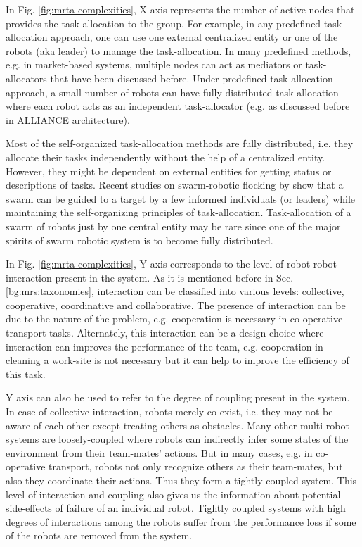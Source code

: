 In Fig. \ref{fig:mrta-complexities}, X axis represents the number of active nodes that provides the task-allocation to the group. For example, in any predefined  task-allocation approach, one can use one external centralized entity or one of the robots (aka leader) to manage the task-allocation. In many predefined methods, e.g. in market-based systems,  multiple nodes can act as mediators or task-allocators that have been discussed before. Under predefined task-allocation approach,  a small number of robots can have fully distributed task-allocation where each robot acts as an independent task-allocator (e.g. as discussed before in ALLIANCE architecture). 

Most of the self-organized task-allocation methods are fully distributed, i.e. they allocate their tasks independently without the help of a centralized entity. However, they might be dependent on external entities for getting status or descriptions of tasks. Recent studies on swarm-robotic flocking by  show that a swarm can be guided to a target by a few informed individuals (or leaders) while  maintaining the self-organizing principles of task-allocation. Task-allocation of a swarm of robots  just by one central entity may be rare since one of the major spirits of swarm robotic system is to become fully distributed.

In Fig. \ref{fig:mrta-complexities},  Y axis corresponds to the level of robot-robot interaction present in the system. As it is mentioned before in Sec. \ref{bg:mrs:taxonomies}, interaction can be classified into various levels: collective, cooperative, coordinative and collaborative. The presence of interaction can be due to the nature of the problem, e.g. cooperation is necessary in co-operative transport tasks. Alternately, this interaction can be a design choice where interaction can improves the performance of the team, e.g. cooperation in cleaning a work-site is not necessary but it can help to improve the  efficiency of this task. 

Y axis can also be used to refer to the degree of coupling present in the system.  In case of collective interaction, robots merely co-exist, i.e.  they may not be aware of each other except treating others as obstacles. Many other multi-robot systems are loosely-coupled where robots can indirectly infer some states of the environment from their team-mates' actions.  But in many cases, e.g. in  co-operative transport, robots not only recognize others as their team-mates, but also they coordinate their actions. Thus they form a  tightly coupled system. This level of interaction and coupling also gives us the information about potential side-effects of failure of an individual robot. Tightly coupled systems with high degrees of interactions among the robots  suffer from the performance loss if some of the robots are removed from the system.

